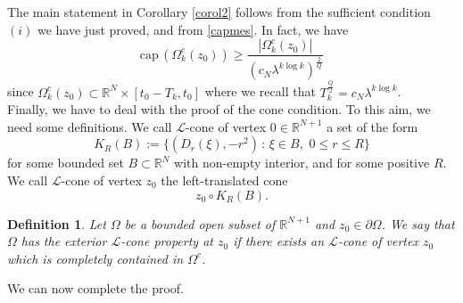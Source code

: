 \documentclass[10pt]{amsart}
\def \de {\partial}
\def \RNu {\mathbb{R}^{N+1}}
\def \RN {\mathbb{R}^N}
\def\elle{\mathcal{L}}
\def\erre{\mathbb{R}}
\def\erreu{{\erre^{ {N+1} }}}
\newtheorem{definition}[theorem]{Definition}
\numberwithin{equation}{section}
\begin{document}
The main statement in Corollary \ref{corol2} follows from the sufficient condition $(i)$ we have just proved, and from \eqref{capmes}. In fact, we have
\begin{equation}\label{capmesterm}
\mathrm{cap\, } (\Omega^c_k(z_0))\geq\frac{|\Omega^c_k(z_0)|}{\left(c_N\lambda^{k\log{k}}\right)^{\frac{2}{Q}}}
\end{equation}
since $\Omega^c_k(z_0)\subset \RN\times [t_0-T_k,t_0]$ where we recall that $T_k^{\frac{Q}{2}}=c_N\lambda^{k\log{k}}$.\\ 
Finally, we have to deal with the proof of the cone condition. To this aim, we need some definitions. We call $\elle$-cone of vertex $0\in\RNu$ a set of the form
$$K_R(B):=\{(D_r(\xi),-r^2)\,:\,\xi\in B,\,\,0\leq r\leq R\}$$
for some bounded set $B\subset \RN$ with non-empty interior, and for some positive $R$. We call $\elle$-cone of vertex $z_0$ the left-translated cone
$$z_0\circ K_R(B).$$
\begin{definition}
Let $\Omega$ be a bounded open subset of $\erreu$ and $z_0 \in \de\Omega$. We say that $\Omega$ has the exterior $\elle$-cone property at $z_0$ if there exists an $\elle$-cone of vertex $z_0$ which is completely contained in $\Omega^c$.
\end{definition}
We can now complete the proof.
\end{document}
